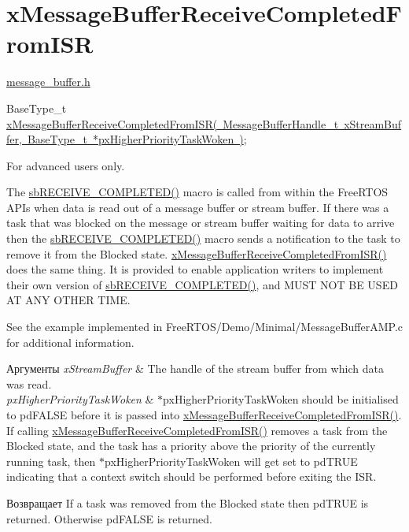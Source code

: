 \hypertarget{group__x_message_buffer_receive_completed_from_i_s_r}{}\section{x\+Message\+Buffer\+Receive\+Completed\+From\+I\+SR}
\label{group__x_message_buffer_receive_completed_from_i_s_r}
\mbox{\hyperlink{message__buffer_8h}{message\+\_\+buffer.\+h}}


\begin{DoxyPre}
BaseType\_t \mbox{\hyperlink{message__buffer_8h_a22b1a37d0d4f39acd87250f73d9aab0c}{xMessageBufferReceiveCompletedFromISR( MessageBufferHandle\_t xStreamBuffer, BaseType\_t *pxHigherPriorityTaskWoken )}};
\end{DoxyPre}


For advanced users only.

The \mbox{\hyperlink{stream__buffer_8c_a4d6a29d283acfa2d4ef576476eedc789}{sb\+R\+E\+C\+E\+I\+V\+E\+\_\+\+C\+O\+M\+P\+L\+E\+T\+E\+D()}} macro is called from within the Free\+R\+T\+OS A\+P\+Is when data is read out of a message buffer or stream buffer. If there was a task that was blocked on the message or stream buffer waiting for data to arrive then the \mbox{\hyperlink{stream__buffer_8c_a4d6a29d283acfa2d4ef576476eedc789}{sb\+R\+E\+C\+E\+I\+V\+E\+\_\+\+C\+O\+M\+P\+L\+E\+T\+E\+D()}} macro sends a notification to the task to remove it from the Blocked state. \mbox{\hyperlink{message__buffer_8h_a22b1a37d0d4f39acd87250f73d9aab0c}{x\+Message\+Buffer\+Receive\+Completed\+From\+I\+S\+R()}} does the same thing. It is provided to enable application writers to implement their own version of \mbox{\hyperlink{stream__buffer_8c_a4d6a29d283acfa2d4ef576476eedc789}{sb\+R\+E\+C\+E\+I\+V\+E\+\_\+\+C\+O\+M\+P\+L\+E\+T\+E\+D()}}, and M\+U\+ST N\+OT BE U\+S\+ED AT A\+NY O\+T\+H\+ER T\+I\+ME.

See the example implemented in Free\+R\+T\+O\+S/\+Demo/\+Minimal/\+Message\+Buffer\+A\+M\+P.\+c for additional information.


\begin{DoxyParams}{Аргументы}
{\em x\+Stream\+Buffer} & The handle of the stream buffer from which data was read.\\
\hline
{\em px\+Higher\+Priority\+Task\+Woken} & $\ast$px\+Higher\+Priority\+Task\+Woken should be initialised to pd\+F\+A\+L\+SE before it is passed into \mbox{\hyperlink{message__buffer_8h_a22b1a37d0d4f39acd87250f73d9aab0c}{x\+Message\+Buffer\+Receive\+Completed\+From\+I\+S\+R()}}. If calling \mbox{\hyperlink{message__buffer_8h_a22b1a37d0d4f39acd87250f73d9aab0c}{x\+Message\+Buffer\+Receive\+Completed\+From\+I\+S\+R()}} removes a task from the Blocked state, and the task has a priority above the priority of the currently running task, then $\ast$px\+Higher\+Priority\+Task\+Woken will get set to pd\+T\+R\+UE indicating that a context switch should be performed before exiting the I\+SR.\\
\hline
\end{DoxyParams}
\begin{DoxyReturn}{Возвращает}
If a task was removed from the Blocked state then pd\+T\+R\+UE is returned. Otherwise pd\+F\+A\+L\+SE is returned. 
\end{DoxyReturn}
